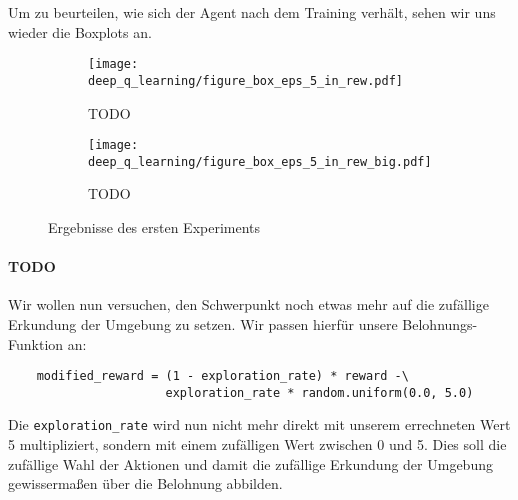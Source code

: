 Um zu beurteilen, wie sich der Agent nach dem Training verhält, sehen wir uns wieder die Boxplots an.

\begin{figure}[h!]
    \centering
    \begin{subfigure}[b]{0.7\textwidth}
        \texttt{[image: deep\_q\_learning/figure\_box\_eps\_5\_in\_rew.pdf]}
        \caption{TODO}
        \label{img:graphBoxEps5InRew}
    \end{subfigure}
    \begin{subfigure}[b]{0.7\textwidth}
        \texttt{[image: deep\_q\_learning/figure\_box\_eps\_5\_in\_rew\_big.pdf]}
        \caption{TODO}
        \label{img:graphBoxEps5InRewBig}
    \end{subfigure}
    \caption{Ergebnisse des ersten Experiments}
\end{figure} \label{img:graphBoxEps5InRewBoth}

\paragraph{TODO}
Wir wollen nun versuchen, den Schwerpunkt noch etwas mehr auf die zufällige Erkundung der Umgebung zu setzen. Wir passen hierfür unsere Belohnungs-Funktion an:
\begin{verbatim}
    modified_reward = (1 - exploration_rate) * reward -\
                      exploration_rate * random.uniform(0.0, 5.0)
\end{verbatim}
Die \texttt{exploration_rate} wird nun nicht mehr direkt mit unserem errechneten Wert 5 multipliziert, sondern mit einem zufälligen Wert zwischen 0 und 5. Dies soll die zufällige Wahl der Aktionen und damit die zufällige Erkundung der Umgebung gewissermaßen über die Belohnung abbilden.